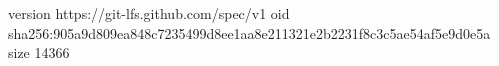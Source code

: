 version https://git-lfs.github.com/spec/v1
oid sha256:905a9d809ea848c7235499d8ee1aa8e211321e2b2231f8c3c5ae54af5e9d0e5a
size 14366
